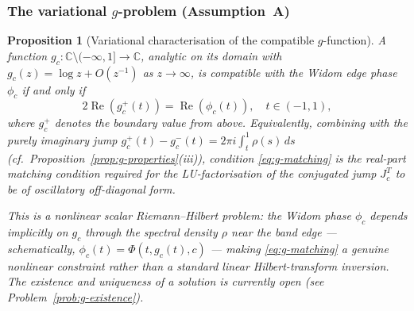 \documentclass[12pt,a4paper]{amsart}
\newtheorem{proposition}[theorem]{Proposition}
\theoremstyle{definition}
\theoremstyle{remark}
\begin{document}
\subsubsection{The variational $g$-problem (Assumption~A)}

\begin{proposition}[Variational characterisation of the compatible
$g$-function]
\label{prop:g-variational}
A function $g_c:\mathbb{C}\setminus(-\infty,1]\to\mathbb{C}$,
analytic on its domain with $g_c(z)=\log z + O(z^{-1})$ as $z\to\infty$,
is \emph{compatible} with the Widom edge phase $\phi_c$ if and only if
\begin{equation}\label{eq:g-matching}
  2\operatorname{Re}(g_c^+(t)) = \operatorname{Re}(\phi_c(t)),
  \quad t\in(-1,1),
\end{equation}
where $g_c^+$ denotes the boundary value from above.
Equivalently, combining with the purely imaginary jump
$g_c^+(t)-g_c^-(t) = 2\pi i\int_t^1\rho(s)\,ds$
(cf.\ Proposition~\ref{prop:g-properties}(iii)), condition
\eqref{eq:g-matching} is the \emph{real-part matching condition}
required for the LU-factorisation of the conjugated jump $J_c^T$
to be of oscillatory off-diagonal form.

This is a nonlinear scalar Riemann--Hilbert problem: the Widom phase
$\phi_c$ depends implicitly on $g_c$ through the spectral density
$\rho$ near the band edge --- schematically,
$\phi_c(t) = \Phi(t, g_c(t), c)$ --- making \eqref{eq:g-matching}
a genuine nonlinear constraint rather than a standard linear
Hilbert-transform inversion.
The existence and uniqueness of a solution is currently open
(see Problem~\ref{prob:g-existence}).
\end{proposition}
\end{document}
